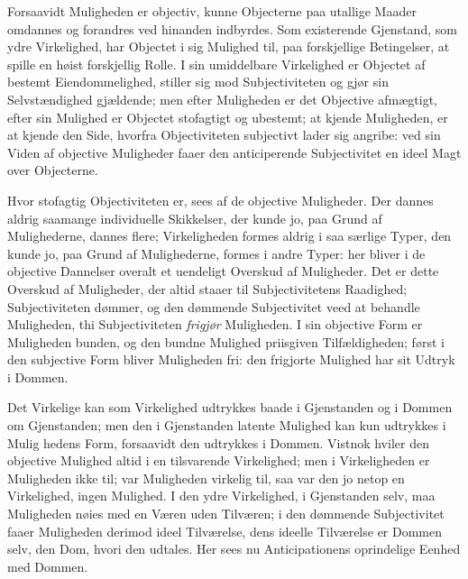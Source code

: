 \documentclass[12pt]{book}
\newcommand{\opage}[1]{\marginnote{\footnotesize\textit{[#1]}}}
\begin{document}
Forsaavidt Muligheden er objectiv, kunne Objecterne paa
utallige Maader omdannes og forandres ved hinanden indbyrdes.
Som existerende Gjenstand, som ydre Virkelighed,
har Objectet i sig Mulighed til, paa forskjellige Betingelser,
at spille en høist forskjellig Rolle. I sin umiddelbare Virkelighed
er Objectet af bestemt Eiendommelighed, stiller sig mod
Subjectiviteten og gjør sin Selvstændighed gjældende; men
efter Muligheden er det Objective afmægtigt, efter sin Mulighed
er Objectet stofagtigt og ubestemt; at kjende Muligheden,
er at kjende den Side, hvorfra Objectiviteten subjectivt lader
sig angribe: ved sin Viden af objective Muligheder faaer den
anticiperende Subjectivitet en ideel Magt over Objecterne.

Hvor stofagtig Objectiviteten er, sees af de objective
Muligheder. Der dannes aldrig saamange individuelle Skikkelser,
der kunde jo, paa Grund af Mulighederne, dannes
flere; Virkeligheden formes aldrig i saa særlige Typer, den
kunde jo, paa Grund af Mulighederne, formes i andre Typer:
her bliver i de objective Dannelser overalt et uendeligt Overskud
af Muligheder. Det er dette Overskud af Muligheder,
der altid staaer til Subjectivitetens Raadighed; Subjectiviteten
dømmer, og den dømmende Subjectivitet veed at behandle
Muligheden, thi Subjectiviteten \emph{frigjør} Muligheden.
I sin objective Form er Muligheden bunden, og den bundne
Mulighed priisgiven Tilfældigheden; først i den subjective
Form bliver Muligheden fri: den frigjorte Mulighed har
sit Udtryk i Dommen.

Det Virkelige kan som Virkelighed udtrykkes baade i
Gjenstanden og i Dommen om Gjenstanden; men den i
Gjenstanden latente Mulighed kan kun udtrykkes i Mulig%
\opage{126}hedens Form, forsaavidt den udtrykkes i Dommen. Vistnok
hviler den objective Mulighed altid i en tilsvarende Virkelighed;
men i Virkeligheden er Muligheden ikke til; var Muligheden
virkelig til, saa var den jo netop en Virkelighed, ingen Mulighed.
I den ydre Virkelighed, i Gjenstanden selv, maa Muligheden
nøies med en Væren uden Tilværen; i den dømmende
Subjectivitet faaer Muligheden derimod ideel Tilværelse, dens
ideelle Tilværelse er Dommen selv, den Dom, hvori den udtales. %
Her sees nu Anticipationens oprindelige Eenhed med
Dommen.
\end{document}
